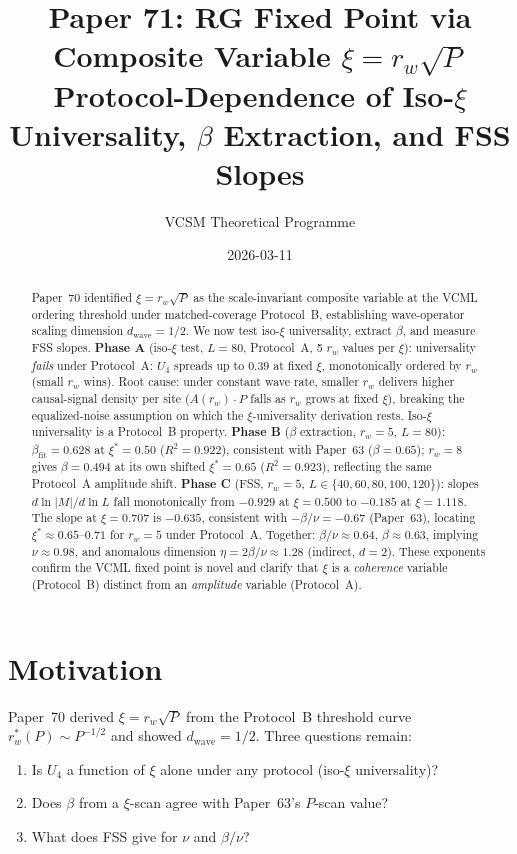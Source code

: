 \documentclass[twocolumn,10pt]{article}
\title{\textbf{Paper 71: RG Fixed Point via Composite Variable
  $\xi = r_w\sqrt{P}$}\\
  \large Protocol-Dependence of Iso-$\xi$ Universality,
  $\beta$ Extraction, and FSS Slopes}
\author{VCSM Theoretical Programme}
\date{2026-03-11}
\begin{document}
\maketitle

\begin{abstract}
Paper~70 identified $\xi = r_w\sqrt{P}$ as the scale-invariant composite
variable at the VCML ordering threshold under matched-coverage Protocol~B,
establishing wave-operator scaling dimension $d_\mathrm{wave}=1/2$.
We now test iso-$\xi$ universality, extract $\beta$, and measure FSS slopes.
\textbf{Phase A} (iso-$\xi$ test, $L=80$, Protocol~A, 5 $r_w$ values per $\xi$):
universality \emph{fails} under Protocol~A: $U_4$ spreads up to $0.39$ at
fixed $\xi$, monotonically ordered by $r_w$ (small $r_w$ wins).
Root cause: under constant wave rate, smaller $r_w$ delivers higher
causal-signal density per site ($A(r_w)\cdot P$ falls as $r_w$ grows at
fixed $\xi$), breaking the equalized-noise assumption on which the
$\xi$-universality derivation rests.
Iso-$\xi$ universality is a Protocol~B property.
\textbf{Phase B} ($\beta$ extraction, $r_w=5$, $L=80$):
$\beta_\mathrm{fit}=0.628$ at $\xi^*=0.50$ ($R^2=0.922$), consistent with
Paper~63 ($\beta=0.65$); $r_w=8$ gives $\beta=0.494$ at its own shifted
$\xi^*=0.65$ ($R^2=0.923$), reflecting the same Protocol~A amplitude shift.
\textbf{Phase C} (FSS, $r_w=5$, $L\in\{40,60,80,100,120\}$):
slopes $d\ln|M|/d\ln L$ fall monotonically from $-0.929$ at $\xi=0.500$
to $-0.185$ at $\xi=1.118$.
The slope at $\xi=0.707$ is $-0.635$, consistent with
$-\beta/\nu=-0.67$ (Paper~63), locating $\xi^*\approx0.65$--$0.71$
for $r_w=5$ under Protocol~A.
Together: $\beta/\nu\approx0.64$, $\beta\approx0.63$, implying $\nu\approx0.98$,
and anomalous dimension $\eta=2\beta/\nu\approx1.28$ (indirect, $d=2$).
These exponents confirm the VCML fixed point is novel and clarify
that $\xi$ is a \emph{coherence} variable (Protocol~B) distinct from an
\emph{amplitude} variable (Protocol~A).
\end{abstract}

\section{Motivation}

Paper~70 derived $\xi=r_w\sqrt{P}$ from the Protocol~B threshold curve
$r_w^*(P)\sim P^{-1/2}$ and showed $d_\mathrm{wave}=1/2$.
Three questions remain:
\begin{enumerate}
  \item Is $U_4$ a function of $\xi$ alone under any protocol
        (iso-$\xi$ universality)?
  \item Does $\beta$ from a $\xi$-scan agree with Paper~63's $P$-scan value?
  \item What does FSS give for $\nu$ and $\beta/\nu$?
\end{enumerate}
\end{document}
